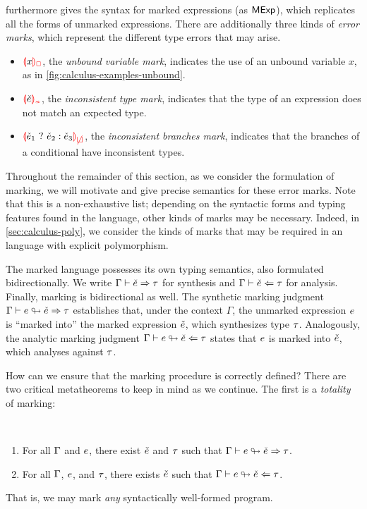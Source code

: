 
 furthermore gives the syntax for marked expressions (as ${\normalfont\textsf{MExp}}$),
which replicates all the forms of unmarked expressions. There are additionally three kinds of
\emph{error marks}, which represent the different type errors that may arise.
%
\begin{itemize}
  \item $\ECUnbound{x}$, the \emph{unbound variable mark}, indicates the use of an unbound variable
    $x$, as in \cref{fig:calculus-examples-unbound}.

  \item $\ECInconType{\ECMV}$, the \emph{inconsistent type mark}, indicates that the type of an
    expression does not match an expected type.

  \item $\ECInconBr{\ECMV_1}{\ECMV_2}{\ECMV_3}$, the \emph{inconsistent branches mark}, indicates
    that the branches of a conditional have inconsistent types.
\end{itemize}
%
Throughout the remainder of this section, as we consider the formulation of marking, we will
motivate and give precise semantics for these error marks. Note that this is a non-exhaustive list;
depending on the syntactic forms and typing features found in the language, other kinds of marks may
be necessary. Indeed, in \cref{sec:calculus-poly}, we consider the kinds of marks that may be
required in an language with explicit polymorphism.

The marked language possesses its own typing semantics, also formulated bidirectionally. We write
$\Gamma \vdash \check{e} \Rightarrow \tau$ for synthesis and $\Gamma \vdash \check{e} \Leftarrow \tau$ for analysis.
Finally, marking is bidirectional as well. The synthetic marking judgment
$\Gamma \vdash e \looparrowright \check{e} \Rightarrow \tau$ establishes that, under the context $\Gamma$, the
unmarked expression $e$ is ``marked into'' the marked expression $\check{e}$, which synthesizes type
$\tau$. Analogously, the analytic marking judgment $\Gamma \vdash e \looparrowright \check{e} \Leftarrow \tau$
states that $e$ is marked into $\check{e}$, which analyses against $\tau$.

How can we ensure that the marking procedure is correctly defined? There are two critical
metatheorems to keep in mind as we continue. The first is a \emph{totality} of marking:
%
\begin{theorem}[name=Marking Totality] \
  \label{thm:calculus-marking-totality}
  \begin{enumerate}
    \item For all $\Gamma$ and $e$, there exist $\check{e}$ and $\tau$ such that
      $\Gamma \vdash e \looparrowright \check{e} \Rightarrow \tau$.
  \item For all $\Gamma$, $e$, and $\tau$, there exists $\check{e}$ such that
    $\Gamma \vdash e \looparrowright \check{e} \Leftarrow \tau$.
  \end{enumerate}
\end{theorem}
%
That is, we may mark \emph{any} syntactically well-formed program.

